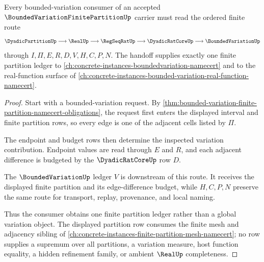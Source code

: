 \begin{theorem}
\label{thm:bounded-variation-finite-partition-ledger-handoff}
Every bounded-variation consumer of an accepted $\BoundedVariationFinitePartitionUp$ carrier must read the ordered finite route
$$
\DyadicPartitionUp
\longrightarrow
\RealUp
\longrightarrow
\RegSeqRatUp
\longrightarrow
\DyadicRatCoreUp
\longrightarrow
\BoundedVariationUp
$$
through $I,\Pi,E,R,D,V,H,C,P,N$. The handoff supplies exactly one finite partition ledger to \autoref{ch:concrete-instances-boundedvariation-namecert} and to the real-function surface of \autoref{ch:concrete-instances-bounded-variation-real-function-namecert}.
\end{theorem}
\begin{proof}
Start with a bounded-variation request. By \autoref{thm:bounded-variation-finite-partition-namecert-obligations}, the request first enters the displayed interval and finite partition rows, so every edge is one of the adjacent cells listed by $\Pi$.

The endpoint and budget rows then determine the inspected variation contribution. Endpoint values are read through $E$ and $R$, and each adjacent difference is budgeted by the $\DyadicRatCoreUp$ row $D$.

The $\BoundedVariationUp$ ledger $V$ is downstream of this route. It receives the displayed finite partition and its edge-difference budget, while $H,C,P,N$ preserve the same route for transport, replay, provenance, and local naming.

Thus the consumer obtains one finite partition ledger rather than a global variation object. The displayed partition row consumes the finite mesh and adjacency sibling of \autoref{ch:concrete-instances-finite-partition-mesh-namecert}; no row supplies a supremum over all partitions, a variation measure, host function equality, a hidden refinement family, or ambient $\RealUp$ completeness.
\end{proof}


